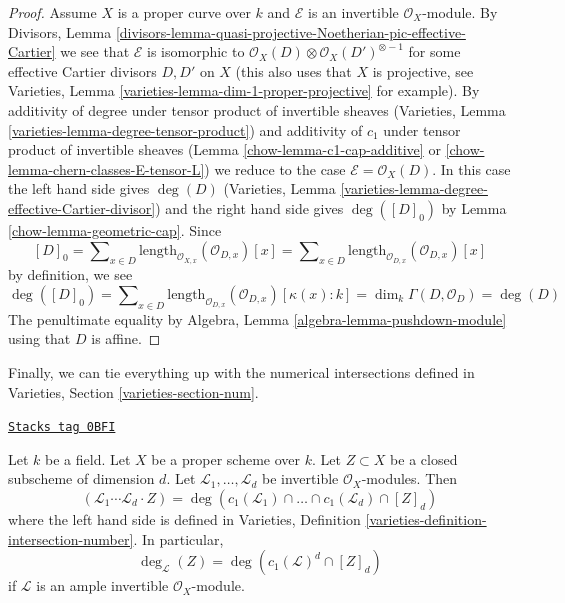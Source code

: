 \begin{proof}
\medskip\noindent
Assume $X$ is a proper curve over $k$ and $\mathcal{E}$ is an
invertible $\mathcal{O}_X$-module. By
Divisors, Lemma
\ref{divisors-lemma-quasi-projective-Noetherian-pic-effective-Cartier}
we see that $\mathcal{E}$ is isomorphic to
$\mathcal{O}_X(D) \otimes \mathcal{O}_X(D')^{\otimes -1}$
for some effective Cartier divisors $D, D'$ on $X$ (this also uses
that $X$ is projective, see
Varieties, Lemma \ref{varieties-lemma-dim-1-proper-projective} for example).
By additivity of degree under tensor product of invertible sheaves
(Varieties, Lemma \ref{varieties-lemma-degree-tensor-product})
and additivity of $c_1$ under tensor product of invertible sheaves
(Lemma \ref{chow-lemma-c1-cap-additive} or \ref{chow-lemma-chern-classes-E-tensor-L})
we reduce to the case $\mathcal{E} = \mathcal{O}_X(D)$.
In this case the left hand side gives $\deg(D)$
(Varieties, Lemma \ref{varieties-lemma-degree-effective-Cartier-divisor})
and the right hand side gives $\deg([D]_0)$ by
Lemma \ref{chow-lemma-geometric-cap}.
Since
$$
[D]_0 = \sum\nolimits_{x \in D}
\text{length}_{\mathcal{O}_{X, x}}(\mathcal{O}_{D, x}) [x] =
\sum\nolimits_{x \in D}
\text{length}_{\mathcal{O}_{D, x}}(\mathcal{O}_{D, x}) [x]
$$
by definition, we see
$$
\deg([D]_0) = \sum\nolimits_{x \in D}
\text{length}_{\mathcal{O}_{D, x}}(\mathcal{O}_{D, x}) [\kappa(x) : k] =
\dim_k \Gamma(D, \mathcal{O}_D) = \deg(D)
$$
The penultimate equality by
Algebra, Lemma \ref{algebra-lemma-pushdown-module}
using that $D$ is affine.
\end{proof}

Finally, we can tie everything up with the numerical intersections
defined in Varieties, Section \ref{varieties-section-num}.

\begin{lemma}
\label{chow-lemma-degrees-and-numerical-intersections}
\href{https://stacks.math.columbia.edu/tag/0BFI}{\texttt{Stacks tag 0BFI}}

Let $k$ be a field. Let $X$ be a proper scheme over $k$.
Let $Z \subset X$ be a closed subscheme of dimension $d$.
Let $\mathcal{L}_1, \ldots, \mathcal{L}_d$ be invertible
$\mathcal{O}_X$-modules. Then
$$
(\mathcal{L}_1 \cdots \mathcal{L}_d \cdot Z) =
\deg(
c_1(\mathcal{L}_1) \cap \ldots \cap c_1(\mathcal{L}_d) \cap [Z]_d)
$$
where the left hand side is defined in
Varieties, Definition \ref{varieties-definition-intersection-number}.
In particular,
$$
\deg_\mathcal{L}(Z) = \deg(c_1(\mathcal{L})^d \cap [Z]_d)
$$
if $\mathcal{L}$ is an ample invertible $\mathcal{O}_X$-module.
\end{lemma}

